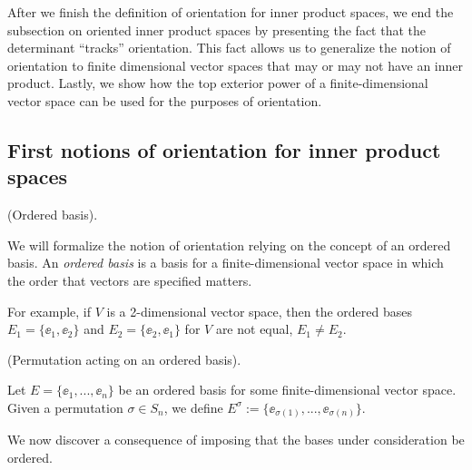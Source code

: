 After we finish the definition of orientation for inner product spaces, we end the subsection on oriented inner product spaces by presenting the fact that the determinant ``tracks'' orientation. This fact allows us to generalize the notion of orientation to finite dimensional vector spaces that may or may not have an inner product. Lastly, we show how the top exterior power of a finite-dimensional vector space can be used for the purposes of orientation.

\subsection*{First notions of orientation for inner product spaces}

\begin{defn}
    (Ordered basis).
    
    We will formalize the notion of orientation relying on the concept of an ordered basis. An \textit{ordered basis} is a basis for a finite-dimensional vector space in which the order that vectors are specified matters. 
    
    For example, if $V$ is a 2-dimensional vector space, then the ordered bases $E_1 = \{\ee_1, \ee_2\}$ and $E_2 = \{\ee_2, \ee_1\}$ for $V$ are not equal, $E_1 \neq E_2$.
\end{defn}

\begin{defn}
    (Permutation acting on an ordered basis). 
    
    Let $E = \{\ee_1, ..., \ee_n\}$ be an ordered basis for some finite-dimensional vector space. Given a permutation $\sigma \in S_n$, we define $E^\sigma := \{\ee_{\sigma(1)}, ..., \ee_{\sigma(n)}\}$.
\end{defn}

We now discover a consequence of imposing that the bases under consideration be ordered.

